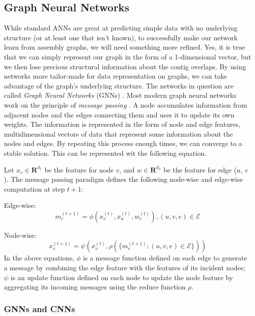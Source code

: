 \documentclass[times, utf8, diplomski, english]{fer_eng}
\begin{document}
\subsection{Graph Neural Networks}
\label{subsec:graph neural networks}

While standard ANNs are great at predicting simple data with no underlying structure (or at least one that isn't known), to successfully make our network learn from assembly graphs, we will need something more refined. Yes, it is true that we can simply represent our graph in the form of a 1-dimensional vector, but we then lose precious structural information about the contig overlaps. By using networks more tailor-made for data representation on graphs, we can take advantage of the graph's underlying structure. The networks in question are called \textit{Graph Neural Networks} (GNNs) \cite{GNN}. Most modern graph neural networks work on the principle of \textit{message passing} \cite{message_passing}. A node accumulates information from adjacent nodes and the edges connecting them and uses it to update its own weights. The information is represented in the form of node and edge features, multidimensional vectors of data that represent some information about the nodes and edges. By repeating this process enough times, we can converge to a stable solution. This can be represented wit the following equation.


Let $x_v \in \mathbf{R}^{d_1}$ be the feature for node $v$, and $w \in \mathbf{R}^{d_2}$ be the feature for edge ($u$, $v$). The message passing paradigm defines the following node-wise and edge-wise computation at step $t+1$:

Edge-wise: \[ m_e^{(t+1)} = \phi (x_v^{(t)}, x_u^{(t)}, w_e^{(t)}), (u, v, e) \in \mathcal{E} \]

Node-wise: \[ x_v^{(t+1)} = \psi (x_v^{(t)}, \rho (\{m_e^{(t+1)}: (u, v, e) \in \mathcal{E}\})) \]
In the above equations, $\phi$ is a message function defined on each edge to generate a message by combining the edge feature with the features of its incident nodes; $\psi$ is an update function defined on each node to update the node feature by aggregating its incoming messages using the reduce function $\rho$.

\subsubsection{GNNs and CNNs}
\end{document}

